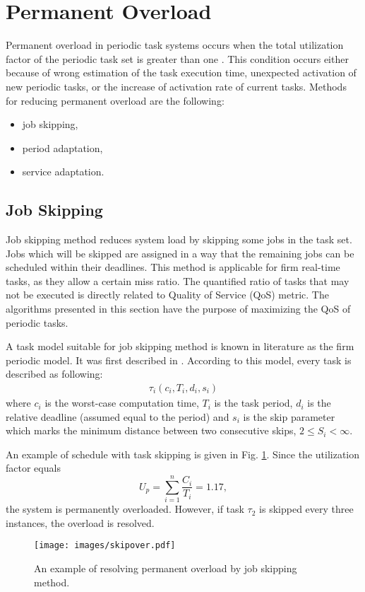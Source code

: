 \section{Permanent Overload}

Permanent overload in periodic task systems occurs when the total utilization factor of the periodic task set is greater than one \cite{buttazzo2011hard}. 
This condition occurs either because of wrong estimation of the task execution time, unexpected activation of new periodic tasks, or the increase of activation rate of current tasks.
Methods for reducing permanent overload are the following:
\begin{itemize}
	\item{job skipping,}
	\item{period adaptation,}
	\item{service adaptation.}
\end{itemize}

\subsection{Job Skipping}
\label{skip_algs}
Job skipping method reduces system load by skipping some jobs in the task set. Jobs which will be skipped are assigned in a way that the remaining jobs can be scheduled within their deadlines.
This method is applicable for firm real-time tasks, as they allow a certain miss ratio. 
The quantified ratio of tasks that may not be executed is directly related to Quality of Service 
(QoS) metric. 
The algorithms presented in this section have the purpose of maximizing the QoS of periodic tasks.

A task model suitable for job skipping method is known in literature as the firm periodic model.
It was first described in \cite{koren1995skip}.
According to this model, every task is described as following:
\begin{align*}
\tau_i(c_i, T_i, d_i, s_i)
\end{align*}
where $c_i$ is the worst-case computation time, $T_i$ is the task period, $d_i$ is the relative deadline (assumed equal to the period) and $s_i$ is the skip parameter which marks the minimum distance between two consecutive skips, \(2 \leq S_i < \infty\).

An example of schedule with task skipping is given in Fig. \ref{skipover}. 
Since the utilization factor equals 
\begin{equation*}
U_p = \sum_{i=1}^{n} \frac{C_i}{T_i} = 1.17,
\end{equation*}
the system is permanently overloaded. 
However, if task \(\tau_2\) is skipped every three instances, the overload is resolved.
\\
\begin{figure}[ht]
    \centering
    \texttt{[image: images/skipover.pdf]}
    \caption{An example of resolving permanent overload by job skipping method.}
    \label{skipover}
\end{figure}

